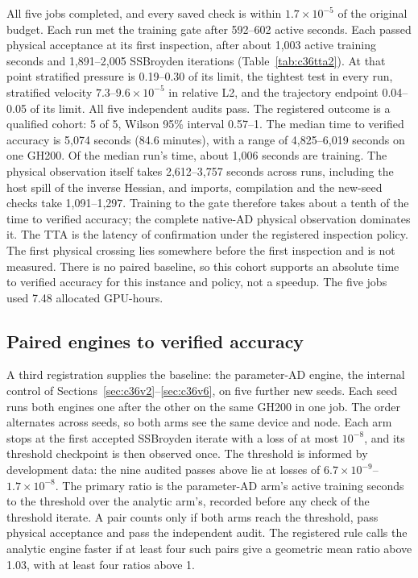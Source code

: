 \documentclass[11pt]{article}
\begin{document}
All five jobs completed, and every saved check is within
$1.7\times10^{-5}$ of the original budget. Each run met the training gate
after 592--602 active seconds. Each passed physical acceptance at its first
inspection, after about 1,003 active training seconds and 1,891--2,005
SSBroyden iterations (Table~\ref{tab:c36tta2}). At that point stratified
pressure is 0.19--0.30 of its limit, the tightest test in every run,
stratified velocity $7.3$--$9.6\times10^{-5}$ in relative L2, and the
trajectory endpoint 0.04--0.05 of its limit. All five independent audits
pass. The registered outcome is a qualified cohort: 5 of 5, Wilson 95\%
interval 0.57--1. The median time to verified accuracy is 5,074 seconds
(84.6 minutes), with a range of 4,825--6,019 seconds on one GH200. Of the
median run's time, about 1,006 seconds are training. The physical
observation itself takes 2,612--3,757 seconds across runs, including the
host spill of the inverse Hessian, and imports, compilation and the
new-seed checks take 1,091--1,297. Training to the
gate therefore takes about a tenth of the time to verified accuracy; the
complete native-AD physical observation dominates it. The TTA is the
latency of confirmation under the registered inspection policy. The first
physical crossing lies somewhere before the first inspection and is not
measured. There is no paired baseline, so this cohort supports an
absolute time to verified accuracy for this instance and policy, not a
speedup. The five jobs used 7.48 allocated GPU-hours.

\subsection{Paired engines to verified accuracy}\label{sec:c36pair}
A third registration supplies the baseline: the parameter-AD engine, the
internal control of Sections~\ref{sec:c36v2}--\ref{sec:c36v6}, on five
further new seeds. Each seed runs both engines one after the other on the
same GH200 in one job. The order alternates across seeds, so both arms
see the same device and node. Each arm stops at the first accepted
SSBroyden iterate with a loss of at most $10^{-8}$, and its threshold
checkpoint is then observed once. The threshold is informed by development
data: the nine audited passes above lie at losses of
$6.7\times10^{-9}$--$1.7\times10^{-8}$. The primary ratio is the
parameter-AD arm's active training seconds to the threshold over the
analytic arm's, recorded before any check of the threshold iterate. A pair
counts only if both arms reach the threshold, pass physical acceptance and
pass the independent audit. The registered rule calls the analytic engine
faster if at least four such pairs give a geometric mean ratio above 1.03,
with at least four ratios above 1.
\end{document}

